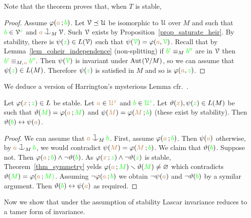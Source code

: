 \documentclass[creche.tex]{subfiles}
\begin{document}
Note that the theorem proves that, when $T$ is stable, 


\begin{proof}
  Assume $\varphi({\color{brown} a}\,;{\color{green} b})$.
  Let $\EuScript V\preceq\EuScript U$ be isomorphic to $\EuScript U$ over $M$ and such that ${\color{green} b}\in\EuScript V^{\color{green} z}$ and ${\mr a}\cnonfork_M\V$. Such $\EuScript V$ exists by Proposition~\ref{prop_saturate_heir}.
  By stability, there is $\psi({\color{green} z})\in L(\EuScript V)$ such that $\psi({\color{green}\EuScript V})=\varphi({\color{brown} a},{\color{green}\EuScript V})$.
  Recall that by Lemma~\ref{lem_coheir_independence} (non-splitting) if ${\color{green} b'}\equiv_M{\color{green} b''}$ are in $\EuScript V$ then ${\color{green} b'}\equiv_{M,\kern.2ex{\color{brown} a}}{\color{green} b''}$.
  Then $\psi({\color{green}\EuScript V})$ is invariant under ${\rm Aut\kern.15ex}(\EuScript V/M)$, so we can assume that $\psi({\color{green} z})\in L(M)$.
  Therefore $\psi({\color{green} z})$ is satisfied in $M$ and so is $\varphi({\color{brown} a},{\color{green} z})$.
\end{proof}

We deduce a version of Harrington's mysterious Lemma cfr.~\cite[Lemma 8.3.4]{TZ}.

\begin{corollary}\label{corol_harrington0}
  Let $\varphi({\color{brown} x}\,;{\color{green} z})\in L$ be stable.
  Let ${\color{brown} a}\in{\color{brown}\EuScript U^x}$ and ${\color{green} b}\in{\color{green}\EuScript U^z}$.
  Let $\vartheta({\color{brown} x}),\psi({\color{green} z})\in L(M)$ be such that $\vartheta({\color{green} M})=\varphi({\color{brown} a}\,;{\color{green} M})$ and $\psi({\color{brown} M})=\varphi({\color{brown} M}\,;{\color{green} b})$ (these exist by stability).
  Then $\vartheta({\color{green} b})\leftrightarrow\psi({\color{brown} a})$.
\end{corollary}

\begin{proof}
  We can assume that ${\mr a}\cnonfork_M{\gr b}$.
  First, assume $\varphi({\color{brown} a}\,;{\color{green} b})$.
  Then $\psi({\color{brown} a})$ otherwise, by ${\mr a}\cnonfork_M{\gr b}$, we would contradict $\psi({\color{brown} M})=\varphi({\color{brown} M}\,;{\color{green} b})$.
  We claim that $\vartheta({\color{green} b})$.
  Suppose not.
  Then $\varphi({\color{brown} a}\,;{\color{green} b})\wedge\neg\vartheta({\color{green} b})$.
  As $\varphi({\color{brown} x}\,;{\color{green} z})\wedge\neg\vartheta({\color{green} z})$ is stable, Theorem~\ref{thm_symmetry} yelds $\varphi({\color{brown} a}\,;{\color{green} M})\smallsetminus\vartheta({\color{green} M})\neq\varnothing$ which contradicts  $\vartheta({\color{green} M})=\varphi({\color{brown} a}\,;{\color{green} M)}$.
  Assuming $\neg\varphi({\color{brown} a}\,;{\color{green} b})$ we obtain $\neg\psi({\color{brown} a})$ and $\neg\vartheta({\color{green} b})$ by a symilar argument.
  Then $\vartheta({\color{green} b})\leftrightarrow\psi({\color{brown} a})$ as required.
\end{proof}

Now we show that under the assumption of stability Lascar invariance reduces to a tamer form of invariance.
\end{document}
